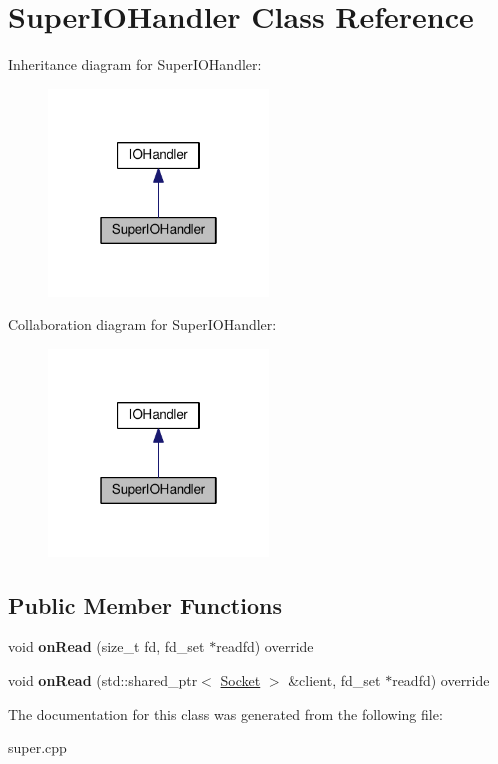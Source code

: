 \hypertarget{classSuperIOHandler}{}\section{Super\+I\+O\+Handler Class Reference}
\label{classSuperIOHandler}


Inheritance diagram for Super\+I\+O\+Handler\+:\nopagebreak
\begin{figure}[H]
\begin{center}
\leavevmode
\includegraphics[width=166pt]{classSuperIOHandler__inherit__graph}
\end{center}
\end{figure}


Collaboration diagram for Super\+I\+O\+Handler\+:\nopagebreak
\begin{figure}[H]
\begin{center}
\leavevmode
\includegraphics[width=166pt]{classSuperIOHandler__coll__graph}
\end{center}
\end{figure}
\subsection*{Public Member Functions}
\begin{DoxyCompactItemize}
\item 
void {\bfseries on\+Read} (size\+\_\+t fd, fd\+\_\+set $\ast$readfd) override\hypertarget{classSuperIOHandler_ac372c2c513d0118b17d69e2a539c6e43}{}\label{classSuperIOHandler_ac372c2c513d0118b17d69e2a539c6e43}

\item 
void {\bfseries on\+Read} (std\+::shared\+\_\+ptr$<$ \hyperlink{classSocket}{Socket} $>$ \&client, fd\+\_\+set $\ast$readfd) override\hypertarget{classSuperIOHandler_a06246ae2e89c1162f213aa231088c2d3}{}\label{classSuperIOHandler_a06246ae2e89c1162f213aa231088c2d3}

\end{DoxyCompactItemize}


The documentation for this class was generated from the following file\+:\begin{DoxyCompactItemize}
\item 
super.\+cpp\end{DoxyCompactItemize}
